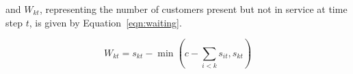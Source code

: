 \documentclass{article}
\begin{document}
and $W_{kt}$, representing the number of customers present but not in service at
time step $t$, is given by Equation~\ref{eqn:waiting}.

\begin{equation}\label{eqn:waiting}
W_{kt} = s_{kt} - \min\left(c - \sum_{i < k} s_{it}, s_{kt}\right)
\end{equation}




\end{document}
